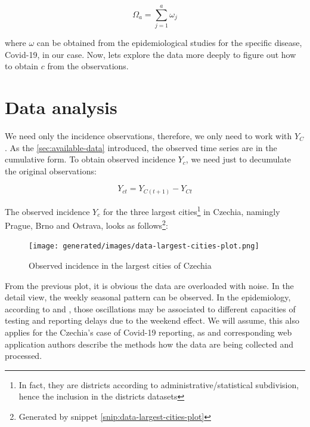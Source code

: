 \documentclass[
  digital, %
  oneside, %
  lof,     %
  lot,     %
]{fithesis4}
\begin{document}
\begin{equation}
  \Omega_a = \sum_{j = 1}^a \omega_j
\end{equation}

where $\omega$ can be obtained from the epidemiological
studies for the specific disease, Covid-19, in our case.
Now, lets explore the data more deeply to figure out how
to obtain $c$ from the observations.







\section{Data analysis}

We need only the incidence observations, therefore, we only
need to work with $Y_C$.
As the \autoref{sec:available-data} introduced, the observed time
series are in the cumulative form.
To obtain observed incidence $Y_c$,
we need just to decumulate the original observations:

\begin{equation}
  Y_{ct} = Y_{C(t + 1)} - Y_{Ct}
\end{equation}

The observed incidence $Y_c$ for the three largest 
cities\footnote{In fact, they are districts according to 
administrative/statistical subdivision, hence the inclusion in the districts datasets} in Czechia, 
namingly Prague, Brno and Ostrava, looks as 
follows\footnote{Generated by snippet 
\ref{snip:data-largest-cities-plot}}:

\begin{figure}[H]
  \begin{center}
    \texttt{[image: generated/images/data-largest-cities-plot.png]}
  \end{center}
  \caption{Observed incidence in the largest cities of Czechia}
  \label{fig:largest-cities-incidence}
\end{figure}

From the previous plot, it is obvious the data are overloaded 
with noise. 
In the detail view, the weekly seasonal pattern can be observed. 
In the epidemiology, according to \cite{liu2021} and \cite{annunziato2020}, 
those oscillations may be associated to different capacities 
of testing and reporting delays due to the weekend effect. 
We will assume, this also applies for the Czechia's case of 
Covid-19 reporting, as \cite{komenda2020} and corresponding web 
application authors describe the methods how the data are
being collected and processed.
\end{document}
